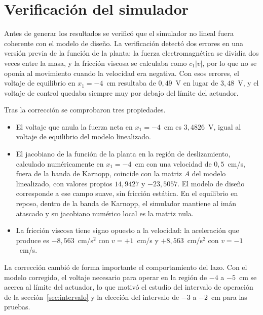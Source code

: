 \chapter{Verificación del simulador}\label{ap:verificacion}

Antes de generar los resultados se verificó que el simulador no lineal fuera coherente con el modelo de diseño. La verificación detectó dos errores en una versión previa de la función de la planta: la fuerza electromagnética se dividía dos veces entre la masa, y la fricción viscosa se calculaba como $c_1|v|$, por lo que no se oponía al movimiento cuando la velocidad era negativa. Con esos errores, el voltaje de equilibrio en $x_1=-4$~cm resultaba de $0{,}49$~V en lugar de $3{,}48$~V, y el voltaje de control quedaba siempre muy por debajo del límite del actuador.

Tras la corrección se comprobaron tres propiedades.

\begin{itemize}
  \item El voltaje que anula la fuerza neta en $x_1=-4$~cm es $3{,}4826$~V, igual al voltaje de equilibrio del modelo linealizado.
  \item El jacobiano de la función de la planta en la región de deslizamiento, calculado numéricamente en $x_1=-4$~cm con una velocidad de $0{,}5$~cm/s, fuera de la banda de Karnopp, coincide con la matriz $A$ del modelo linealizado, con valores propios $14{,}9427$ y $-23{,}5057$. El modelo de diseño corresponde a ese campo suave, sin fricción estática. En el equilibrio en reposo, dentro de la banda de Karnopp, el simulador mantiene al imán atascado y su jacobiano numérico local es la matriz nula.
  \item La fricción viscosa tiene signo opuesto a la velocidad: la aceleración que produce es $-8{,}563$~cm/s$^2$ con $v=+1$~cm/s y $+8{,}563$~cm/s$^2$ con $v=-1$~cm/s.
\end{itemize}

La corrección cambió de forma importante el comportamiento del lazo. Con el modelo corregido, el voltaje necesario para operar en la región de $-4$ a $-5$~cm se acerca al límite del actuador, lo que motivó el estudio del intervalo de operación de la sección~\ref{sec:intervalo} y la elección del intervalo de $-3$ a $-2$~cm para las pruebas.
